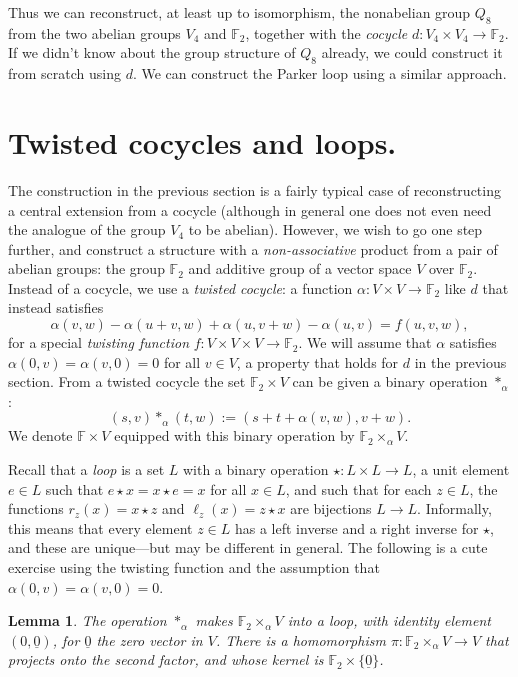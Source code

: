 \documentclass{article}
\theoremstyle{plain}
\newtheorem{lemma}{Lemma}
\theoremstyle{definition}
\def \FF {\mathbb{F}}
\begin{document}
Thus we can reconstruct, at least up to isomorphism, the nonabelian group $Q_8$ from the two abelian groups $V_4$ and $\FF_2$, together with the \emph{cocycle} $d\colon V_4\times V_4\to \FF_2$.
If we didn't know about the group structure of $Q_8$ already, we could construct it from scratch using $d$.
We can construct the Parker loop using a similar approach.


\section{Twisted cocycles and loops.}

The construction in the previous section is a fairly typical case of reconstructing a central extension from a cocycle (although in general one does not even need the analogue of the group $V_4$ to be abelian). 
However, we wish to go one step further, and construct a structure with a \emph{non-associative} product from a pair of abelian groups: the group $\FF_2$ and additive group of a vector space $V$ over $\FF_2$.
Instead of a cocycle, we use a \emph{twisted cocycle}: a function $\alpha\colon V\times V \to \FF_2$ like $d$ that instead satisfies
\[
	\alpha(v,w)-\alpha(u+v,w)+\alpha(u,v+w)-\alpha(u,v) = f(u,v,w),
\]
for a special \emph{twisting function} $f\colon V\times V\times V \to \FF_2$. We will assume that $\alpha$ satisfies $\alpha(0,v)=\alpha(v,0) = 0$ for all $v\in V$, a property that holds for $d$ in the previous section. From a twisted cocycle the set $\FF_2 \times V$ can be given a binary operation $\ast_\alpha$:
\[
	(s,v)\ast_\alpha(t,w):=(s+ t+ \alpha(v,w),v+w).
\]
We denote $\FF \times V$ equipped with this binary operation by $\FF_2\times_\alpha V$.

Recall that a \emph{loop} is a set $L$ with a binary operation $\star\colon L\times L \to L$, a unit element $e\in L$ such that $e\star x = x \star e = x$ for all $x\in L$, and such that for each $z\in L$, the functions $r_z(x) = x \star z$ and $\ell_z(x)=z\star x$ are bijections $L\to L$. 
Informally, this means that every element $z\in L$ has a left inverse and a right inverse for $\star$, and these are unique---but may be different in general. 
The following is a cute exercise using the twisting function and the assumption that $\alpha(0,v)=\alpha(v,0)=0$.

\begin{lemma}
The operation $\ast_\alpha$ makes $\FF_2\times_\alpha V$ into a loop, with identity element $(0,\underline{0})$, for $\underline{0}$ the zero vector in $V$.
There is a homomorphism $\pi\colon \FF_2\times_\alpha V \to V$ that projects onto the second factor, and whose kernel is $\FF_2 \times\{\underline{0}\}$.
\end{lemma}
\end{document}
